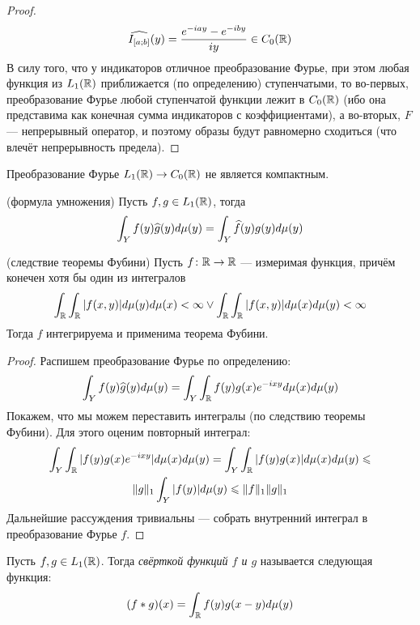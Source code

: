 \begin{proof}
	\[
		\widehat{I_{[a; b]}}(y) = \frac{e^{-iay} - e^{-iby}}{iy} \in C_0(\mathbb{R})
	\]
	В силу того, что у индикаторов отличное преобразование Фурье, при этом любая функция из $L_1(\mathbb{R})$ приближается (по определению) ступенчатыми, то во-первых, преобразование Фурье любой ступенчатой функции лежит в $C_0(\mathbb{R})$ (ибо она представима как конечная сумма индикаторов с коэффициентами), а во-вторых, $F$ --- непрерывный оператор, и поэтому образы будут равномерно сходиться (что влечёт непрерывность предела).
\end{proof}

\begin{exercise}
	Преобразование Фурье $L_1(\mathbb{R}) \to C_0(\mathbb{R})$ не является компактным.
\end{exercise}

\begin{proposition} (формула умножения)
	Пусть $f, g \in L_1(\mathbb{R})$, тогда
	\[
		\int_Y f(y)\widehat{g}(y)d\mu(y) = \int_Y \widehat{f}(y)g(y)d\mu(y)
	\]
\end{proposition}

\begin{reminder} (следствие теоремы Фубини)
	Пусть $f \colon \mathbb{R} \to \mathbb{R}$ --- измеримая функция, причём конечен хотя бы один из интегралов
	\[
		\int_{\mathbb{R}} \int_{\mathbb{R}} |f(x, y)|d\mu(y)d\mu(x) < \infty \vee \int_{\mathbb{R}} \int_{\mathbb{R}} |f(x, y)|d\mu(x)d\mu(y) < \infty
	\]
	Тогда $f$ интегрируема и применима теорема Фубини.
\end{reminder}

\begin{proof}
	Распишем преобразование Фурье по определению:
	\[
		\int_Y f(y)\widehat{g}(y)d\mu(y) = \int_Y \int_{\mathbb{R}} f(y)g(x)e^{-ixy}d\mu(x)d\mu(y)
	\]
	Покажем, что мы можем переставить интегралы (по следствию теоремы Фубини). Для этого оценим повторный интеграл:
	\begin{multline*}
		\int_Y \int_{\mathbb{R}} |f(y)g(x)e^{-ixy}|d\mu(x)d\mu(y) = \int_Y \int_{\mathbb{R}} |f(y)g(x)|d\mu(x)d\mu(y) \leqslant
		\\
		\|g\|_1\int_Y |f(y)|d\mu(y) \leqslant \|f\|_1\|g\|_1
	\end{multline*}
	Дальнейшие рассуждения тривиальны --- собрать внутренний интеграл в преобразование Фурье $f$.
\end{proof}

\begin{definition}
	Пусть $f, g \in L_1(\mathbb{R})$. Тогда \textit{свёрткой функций $f$ и $g$} называется следующая функция:
	\[
		(f * g)(x) = \int_{\mathbb{R}} f(y)g(x - y)d\mu(y)
	\]
\end{definition}

